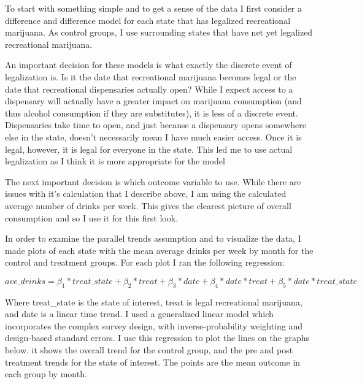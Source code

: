 \documentclass[11pt]{article}
\begin{document}
To start with something simple and to get a sense of the data I first consider a difference and difference model for each state that has legalized recreational marijuana. As control groups, I use surrounding states that have net yet legalized recreational marijuana. \par

An important decision for these models is what exactly the discrete event of legalization is. Is it the date that recreational marijuana becomes legal or the date that recreational dispensaries actually open? While I expect access to a dispensary will actually have a greater impact on marijuana consumption (and thus alcohol consumption if they are substitutes), it is less of a discrete event. Dispensaries take time to open, and just because a dispensary opens somewhere else in the state, doesn't necessarily mean I have much easier access. Once it is legal, however, it is legal for everyone in the state. This led me to use actual legalization as I think it is more appropriate for the model \par 

The next important decision is which outcome variable to use. While there are issues with it's calculation that I describe above, I am using the calculated average number of drinks per week. This gives the clearest picture of overall consumption and so I use it for this first look. \par

In order to examine the parallel trends assumption and to visualize the data, I made plots of each state with the mean average drinks per week by month for the control and treatment groups. For each plot I ran the following regression: 

$$
ave\_drinks =  \beta_1 * treat\_state + \beta_2*treat + \beta_3*date +  \beta_4*date*treat + \beta_5*date*treat\_state
$$

Where treat\_state is the state of interest, treat is legal recreational marijuana, and date is a linear time trend. I used a generalized linear model which incorporates the complex survey design, with inverse-probability weighting and design-based standard errors. I use this regression to plot the lines on the graphs below. it shows the overall trend for the control group, and the pre and post treatment trends for the state of interest.  The points are the mean outcome in each group by month. \par
\end{document}
